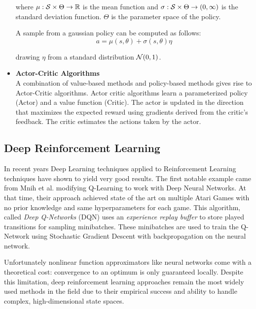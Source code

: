\begin{itemize}
where $\mu: \mathcal{S} \times \Theta \to \mathbb{R}$ is the mean function and $\sigma: \mathcal{S} \times \Theta \to (0, \infty)$ is the standard deviation function.
$\Theta$ is the parameter space of the policy.

A sample from a gaussian policy can be computed as follows:
\begin{equation}
    \label{eq:continuous_action}
    a = \mu(s, \theta) + \sigma(s, \theta) \eta
\end{equation}

drawing $\eta$ from a standard distribution $\mathcal{N}(0,1)$.



\item \textbf{Actor-Critic Algorithms} \\
A combination of value-based methods and policy-based methods gives rise to Actor-Critic algorithms. Actor critic algorithms
learn a parameterized policy (Actor) and a value function (Critic).
The actor is updated in the direction that maximizes the expected reward using gradients derived from the critic's feedback.
The critic estimates the actions taken by the actor.

\end{itemize}

\subsection{Deep Reinforcement Learning}
In recent years Deep Learning techniques applied to Reinforcement Learning techniques have shown to yield very good results.
The first notable example came from Mnih et al. \cite{DQN} modifying Q-Learning to work with Deep Neural Networks.
At that time, their approach achieved state of the art on multiple Atari Games with no prior knowledge and same hyperparameters for each game. This algorithm, called
\textit{Deep Q-Networks} (DQN) uses an \textit{experience replay buffer} to store played transitions for sampling minibatches.
These minibatches are used to train the Q-Network using Stochastic Gradient Descent with backpropagation on the neural network.

Unfortunately nonlinear function approximators like neural networks come with a theoretical cost:
convergence to an optimum is only guaranteed locally. Despite this limitation, deep reinforcement learning approaches remain the most widely used methods in the field 
due to their empirical success and ability to handle complex, high-dimensional state spaces.


